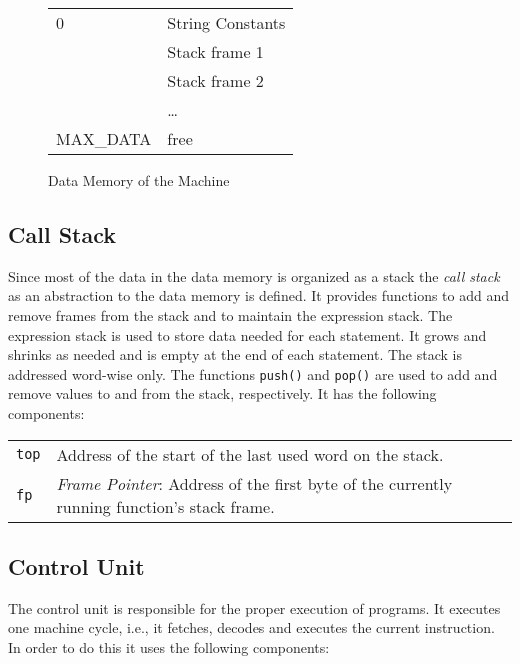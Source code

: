 \begin{figure}
\begin{center}
\begin{tabular}{p{8em}|p{8em}|}
\cline{2-2}
\parbox[t][3em][t]{8em}{\hfill 0} & String Constants \\[3em] 
& Stack frame 1 \\[2em] 
& Stack frame 2 \\[2em] 
& \ldots \\[2em] 
\parbox[b][4em][b]{8em}{\hfill MAX\_DATA} & free \\ 
\end{tabular}
\end{center}
\caption{Data Memory of the \leongage{} Machine}\label{fig:datamemory}
\end{figure}

\subsection{Call Stack}
Since most of the data in the data memory is organized as a stack the {\em call stack} as an abstraction to the data memory is defined. It provides functions to add and remove frames from the stack and to maintain the expression stack.
The expression stack is used to store data needed for each statement. It grows and shrinks as needed and is empty at the end of each statement. The stack is addressed word-wise only. The functions \lstinline$push()$ and \lstinline$pop()$ are used to add and remove values to and from the stack, respectively. It has the following components:

\begin{tabular}{p{}p{}}		
	\lstinline$top$ & Address of the start of the last used word on the stack. \\
	\lstinline$fp$ & {\em Frame Pointer}: Address of the first byte of the currently running function's stack frame. \\
\end{tabular}

\subsection{Control Unit}
The control unit is responsible for the proper execution of programs. It executes one machine cycle, i.e., it fetches, decodes and executes the current instruction. In order to do this it uses the following components:

